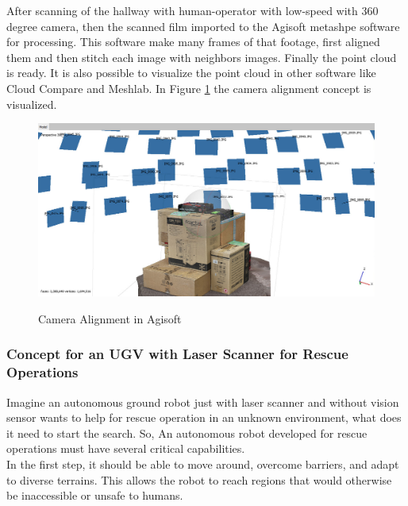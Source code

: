 \noindent After scanning of the hallway with human-operator with low-speed  with 360 degree camera, then the scanned film imported to the Agisoft metashpe software for processing. This software make many frames of that footage, first aligned them and then stitch each image with neighbors images. Finally the point cloud is ready. It is also possible to visualize the point cloud in other software like Cloud Compare and Meshlab. In Figure \ref{fig:Camera Alignment in Agisoft} the camera alignment concept is visualized.  \\
\begin{figure}[H]
  \centering
  \includegraphics[width= 1.0\textwidth]{Figures/AgisoftCameraAlign.PNG}
  \caption[Camera Alignment in Agisoft]{Camera Alignment in Agisoft}
  \label{fig:Camera Alignment in Agisoft} \cite{Agisoft}
\end{figure}






 

\subsubsection{Concept for an UGV with Laser Scanner for Rescue Operations }
Imagine an autonomous ground robot just with laser scanner and without vision sensor wants to help for rescue operation in an unknown environment, what does it need to start the search. So, An autonomous robot developed for rescue operations must have several critical capabilities. \\

In the first step, it should be able to move around, overcome barriers, and adapt to diverse terrains. This allows the robot to reach regions that would otherwise be inaccessible or unsafe to humans. \\ 

